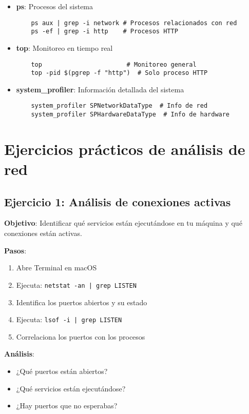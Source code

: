 \begin{itemize}
\begin{itemize}
    \item \textbf{ps}: Procesos del sistema
    \begin{verbatim}
    ps aux | grep -i network # Procesos relacionados con red
    ps -ef | grep -i http    # Procesos HTTP
    \end{verbatim}
    
    \item \textbf{top}: Monitoreo en tiempo real
    \begin{verbatim}
    top                       # Monitoreo general
    top -pid $(pgrep -f "http")  # Solo proceso HTTP
    \end{verbatim}
    
    \item \textbf{system\_profiler}: Información detallada del sistema
    \begin{verbatim}
    system_profiler SPNetworkDataType  # Info de red
    system_profiler SPHardwareDataType  # Info de hardware
    \end{verbatim}
\end{itemize}

\section{Ejercicios prácticos de análisis de red}

\subsection{Ejercicio 1: Análisis de conexiones activas}

\textbf{Objetivo}: Identificar qué servicios están ejecutándose en tu máquina y qué conexiones están activas.

\textbf{Pasos}:
\begin{enumerate}
    \item Abre Terminal en macOS
    \item Ejecuta: \texttt{netstat -an | grep LISTEN}
    \item Identifica los puertos abiertos y su estado
    \item Ejecuta: \texttt{lsof -i | grep LISTEN}
    \item Correlaciona los puertos con los procesos
\end{enumerate}

\textbf{Análisis}:
\begin{itemize}
    \item ¿Qué puertos están abiertos?
    \item ¿Qué servicios están ejecutándose?
    \item ¿Hay puertos que no esperabas?
\end{itemize}


\end{itemize}
